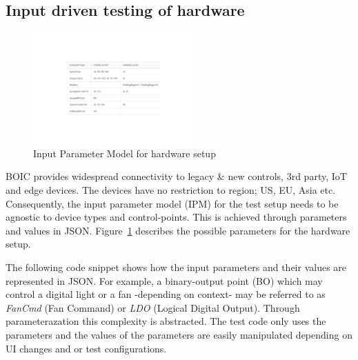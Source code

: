 \documentclass[conference]{IEEEtran}
\begin{document}
	\subsection{Input driven testing of hardware}

	\begin{figure}[!h]
		\includegraphics[width=0.55\textwidth,]{commandingIPM.pdf}
	\caption{Input Parameter Model for hardware setup}
	\label{fig:commandingIPM}
	\end{figure}

	BOIC provides widespread connectivity to legacy \& new controls, 3rd party, IoT and edge devices. The devices have no restriction to region; US, EU, Asia etc. 
	Consequently, the input parameter model (IPM) for the test setup needs to be agnostic to device types and control-points. This is achieved through parameters and values in JSON.
	Figure~\ref{fig:commandingIPM} describes the possible parameters for the hardware setup.

	The following code snippet shows how the input parameters and their values are represented in JSON. 
	For example, a binary-output point (BO) which may control a digital light or a fan -depending on context- may be referred to as \textit{FanCmd} (Fan Command) or \textit{LDO} (Logical Digital Output).
  Through parameterazation this complexity is abstracted. The test code only uses the parameters and the values of the parameters are easily manipulated depending on UI changes and or test configurations.
\end{document}
